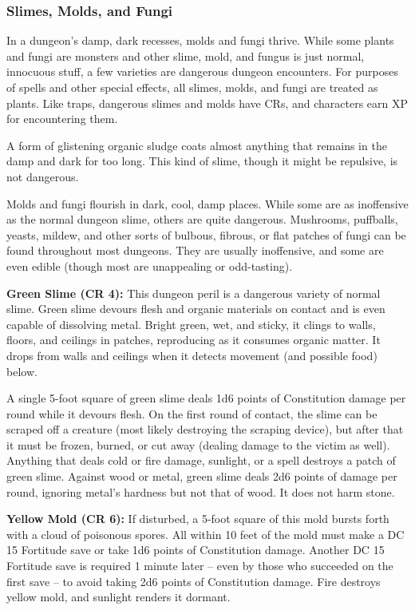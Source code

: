 \subsubsection{Slimes, Molds, and Fungi}

In a dungeon's damp, dark recesses, molds and fungi thrive. While some plants and fungi are monsters and other slime, mold, and fungus is just normal, innocuous stuff, a few varieties are dangerous dungeon encounters. For purposes of spells and other special effects, all slimes, molds, and fungi are treated as plants. Like traps, dangerous slimes and molds have CRs, and characters earn XP for encountering them.

A form of glistening organic sludge coats almost anything that remains in the damp and dark for too long. This kind of slime, though it might be repulsive, is not dangerous.

Molds and fungi flourish in dark, cool, damp places. While some are as inoffensive as the normal dungeon slime, others are quite dangerous. Mushrooms, puffballs, yeasts, mildew, and other sorts of bulbous, fibrous, or flat patches of fungi can be found throughout most dungeons. They are usually inoffensive, and some are even edible (though most are unappealing or odd-tasting).

\textbf{Green Slime (CR 4):} This dungeon peril is a dangerous variety of normal slime. Green slime devours flesh and organic materials on contact and is even capable of dissolving metal. Bright green, wet, and sticky, it clings to walls, floors, and ceilings in patches, reproducing as it consumes organic matter. It drops from walls and ceilings when it detects movement (and possible food) below.

A single 5-foot square of green slime deals 1d6 points of Constitution damage per round while it devours flesh. On the first round of contact, the slime can be scraped off a creature (most likely destroying the scraping device), but after that it must be frozen, burned, or cut away (dealing damage to the victim as well). Anything that deals cold or fire damage, sunlight, or a  spell destroys a patch of green slime. Against wood or metal, green slime deals 2d6 points of damage per round, ignoring metal's hardness but not that of wood. It does not harm stone.

\textbf{Yellow Mold (CR 6):} If disturbed, a 5-foot square of this mold bursts forth with a cloud of poisonous spores. All within 10 feet of the mold must make a DC 15 Fortitude save or take 1d6 points of Constitution damage. Another DC 15 Fortitude save is required 1 minute later -- even by those who succeeded on the first save -- to avoid taking 2d6 points of Constitution damage. Fire destroys yellow mold, and sunlight renders it dormant.

